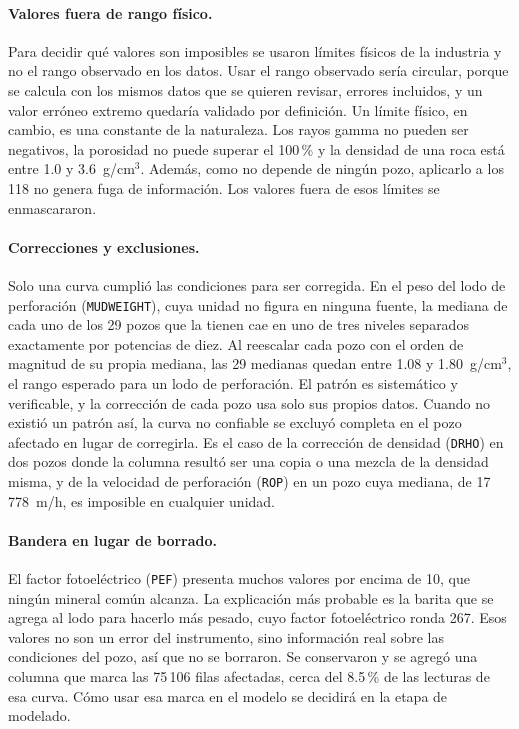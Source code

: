 \documentclass[11pt,a4paper]{article}
\begin{document}
\paragraph{Valores fuera de rango físico.} Para decidir qué valores son imposibles se usaron límites físicos de la industria y no el rango observado en los datos. Usar el rango observado sería circular, porque se calcula con los mismos datos que se quieren revisar, errores incluidos, y un valor erróneo extremo quedaría validado por definición. Un límite físico, en cambio, es una constante de la naturaleza. Los rayos gamma no pueden ser negativos, la porosidad no puede superar el 100\,\% y la densidad de una roca está entre 1.0 y 3.6~g/cm$^3$. Además, como no depende de ningún pozo, aplicarlo a los 118 no genera fuga de información. Los valores fuera de esos límites se enmascararon.

\paragraph{Correcciones y exclusiones.} Solo una curva cumplió las condiciones para ser corregida. En el peso del lodo de perforación (\texttt{MUDWEIGHT}), cuya unidad no figura en ninguna fuente, la mediana de cada uno de los 29 pozos que la tienen cae en uno de tres niveles separados exactamente por potencias de diez. Al reescalar cada pozo con el orden de magnitud de su propia mediana, las 29 medianas quedan entre 1.08 y 1.80~g/cm$^3$, el rango esperado para un lodo de perforación. El patrón es sistemático y verificable, y la corrección de cada pozo usa solo sus propios datos. Cuando no existió un patrón así, la curva no confiable se excluyó completa en el pozo afectado en lugar de corregirla. Es el caso de la corrección de densidad (\texttt{DRHO}) en dos pozos donde la columna resultó ser una copia o una mezcla de la densidad misma, y de la velocidad de perforación (\texttt{ROP}) en un pozo cuya mediana, de 17\,778~m/h, es imposible en cualquier unidad.

\paragraph{Bandera en lugar de borrado.} El factor fotoeléctrico (\texttt{PEF}) presenta muchos valores por encima de 10, que ningún mineral común alcanza. La explicación más probable es la barita que se agrega al lodo para hacerlo más pesado, cuyo factor fotoeléctrico ronda 267. Esos valores no son un error del instrumento, sino información real sobre las condiciones del pozo, así que no se borraron. Se conservaron y se agregó una columna que marca las 75\,106 filas afectadas, cerca del 8.5\,\% de las lecturas de esa curva. Cómo usar esa marca en el modelo se decidirá en la etapa de modelado.
\end{document}

